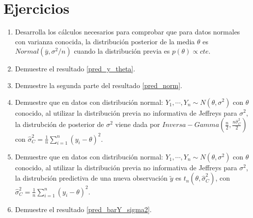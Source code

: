 \section{Ejercicios}
\begin{enumerate}
\item\label{XXX} Desarrolla los c\'alculos necesarios para comprobar que para datos normales con varianza conocida, la distribuci\'on posterior de la media $\theta$ es $Normal(\bar{y},\sigma^2/n)$ cuando la distribuci\'on previa es $p(\theta)\propto cte$. 
\item Demuestre el resultado \ref{pred_y_theta}.
\item\label{Ejer_pre_Jeffreys} Demuestre la segunda parte del resultado \ref{pred_norm}.
\item Demuestre que en datos con distribuci\'on normal: $Y_1,\cdots,Y_n\sim N(\theta,\sigma^2)$ con $\theta$ conocido, al utilizar la distribuci\'on previa no informativa de Jeffreys para $\sigma^2$, la distrubci\'on de posterior de $\sigma^2$ viene dada por $Inversa-Gamma(\frac{n}{2},\frac{n\hat{\sigma}^2_C}{2})$ con $\hat{\sigma}^2_C=\frac{1}{n}\sum_{i=1}^n(y_i-\theta)^2$. 
\item\label{pre_y_sigma2_Jeffreys} Demuestre que en datos con distribuci\'on normal: $Y_1,\cdots,Y_n\sim N(\theta,\sigma^2)$ con $\theta$ conocido, al utilizar la distribuci\'on previa no informativa de Jeffreys para $\sigma^2$, la distrubci\'on predictiva de una nueva observaci\'on $\tilde{y}$ es $t_n(\theta,\hat{\sigma}^2_C)$, con $\hat{\sigma}^2_C=\frac{1}{n}\sum_{i=1}^n(y_i-\theta)^2$. 
\item Demuestre el resultado \ref{pred_barY_sigma2}.
\end{enumerate}


